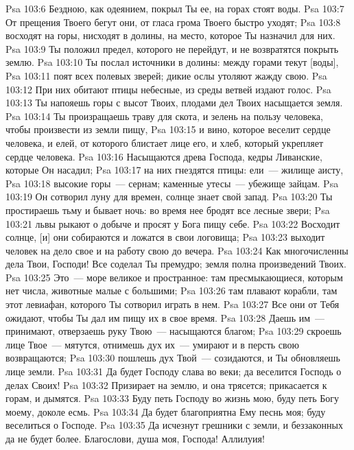 \vs Psa 103:6 Бездною, как одеянием, покрыл Ты ее, на горах стоят воды.
\vs Psa 103:7 От прещения Твоего бегут они, от гласа грома Твоего быстро уходят;
\vs Psa 103:8 восходят на горы, нисходят в долины, на место, которое Ты назначил для них.
\vs Psa 103:9 Ты положил предел, которого не перейдут, и не возвратятся покрыть землю.
\vs Psa 103:10 Ты послал источники в долины: между горами текут [воды],
\vs Psa 103:11 поят всех полевых зверей; дикие ослы утоляют жажду свою.
\vs Psa 103:12 При них обитают птицы небесные, из среды ветвей издают голос.
\vs Psa 103:13 Ты напояешь горы с высот Твоих, плодами дел Твоих насыщается земля.
\vs Psa 103:14 Ты произращаешь траву для скота, и зелень на пользу человека, чтобы произвести из земли пищу,
\vs Psa 103:15 и вино, которое веселит сердце человека, и елей, от которого блистает лице его, и хлеб, который укрепляет сердце человека.
\vs Psa 103:16 Насыщаются древа Господа, кедры Ливанские, которые Он насадил;
\vs Psa 103:17 на них гнездятся птицы: ели~--- жилище аисту,
\vs Psa 103:18 высокие горы~--- сернам; каменные утесы~--- убежище зайцам.
\vs Psa 103:19 Он сотворил луну для  времен, солнце знает свой запад.
\vs Psa 103:20 Ты простираешь тьму и бывает ночь: во время нее бродят все лесные звери;
\vs Psa 103:21 львы рыкают о добыче и просят у Бога пищу себе.
\vs Psa 103:22 Восходит солнце, [и] они собираются и ложатся в свои логовища;
\vs Psa 103:23 выходит человек на дело свое и на работу свою до вечера.
\vs Psa 103:24 Как многочисленны дела Твои, Господи! Все соделал Ты премудро; земля полна произведений Твоих.
\vs Psa 103:25 Это~--- море великое и пространное: там пресмыкающиеся, которым нет числа, животные малые с большими;
\vs Psa 103:26 там плавают корабли, там этот левиафан, которого Ты сотворил играть в нем.
\vs Psa 103:27 Все они от Тебя ожидают, чтобы Ты дал им пищу их в свое время.
\vs Psa 103:28 Даешь им~--- принимают, отверзаешь руку Твою~--- насыщаются благом;
\vs Psa 103:29 скроешь лице Твое~--- мятутся, отнимешь дух их~--- умирают и в персть свою возвращаются;
\vs Psa 103:30 пошлешь дух Твой~--- созидаются, и Ты обновляешь лице земли.
\vs Psa 103:31 Да будет Господу слава во веки; да веселится Господь о делах Своих!
\vs Psa 103:32 Призирает на землю, и она трясется; прикасается к горам, и дымятся.
\vs Psa 103:33 Буду петь Господу во  жизнь мою, буду петь Богу моему, доколе есмь.
\vs Psa 103:34 Да будет благоприятна Ему песнь моя; буду веселиться о Господе.
\vs Psa 103:35 Да исчезнут грешники с земли, и беззаконных да не будет более. Благослови, душа моя, Господа! Аллилуия!
